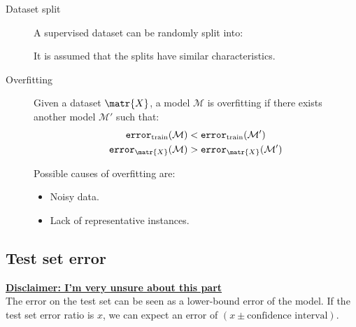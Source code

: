 \begin{description}
    \item[Dataset split]
        A supervised dataset can be randomly split into:
        It is assumed that the splits have similar characteristics.

    \item[Overfitting] 
        Given a dataset $\matr{X}$, a model $\mathcal{M}$ is overfitting if
        there exists another model $\mathcal{M}'$ such that:
        \[ 
            \begin{split}
                \texttt{error}_\text{train}(\mathcal{M}) &< \texttt{error}_\text{train}(\mathcal{M}') \\
                \texttt{error}_\matr{X}(\mathcal{M}) &> \texttt{error}_\matr{X}(\mathcal{M}') \\
            \end{split}    
        \]

        Possible causes of overfitting are:
        \begin{itemize}
            \item Noisy data.
            \item Lack of representative instances.
        \end{itemize}
\end{description}


\subsection{Test set error}
\textbf{\underline{Disclaimer: I'm very unsure about this part}}\\
The error on the test set can be seen as a lower-bound error of the model.
If the test set error ratio is $x$, we can expect an error of $(x \pm  \text{confidence interval})$.

